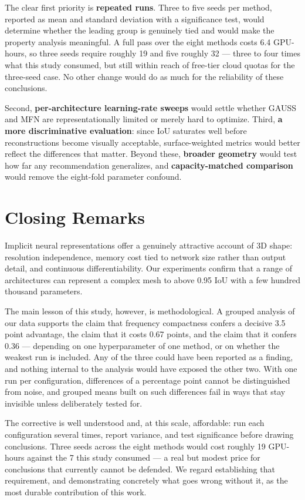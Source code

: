 The clear first priority is \textbf{repeated runs}. Three to five seeds per method, reported as mean and standard deviation with a significance test, would determine whether the leading group is genuinely tied and would make the property analysis meaningful. A full pass over the eight methods costs 6.4 GPU-hours, so three seeds require roughly 19 and five roughly 32 --- three to four times what this study consumed, but still within reach of free-tier cloud quotas for the three-seed case. No other change would do as much for the reliability of these conclusions.

Second, \textbf{per-architecture learning-rate sweeps} would settle whether GAUSS and MFN are representationally limited or merely hard to optimize. Third, \textbf{a more discriminative evaluation}: since IoU saturates well before reconstructions become visually acceptable, surface-weighted metrics would better reflect the differences that matter. Beyond these, \textbf{broader geometry} would test how far any recommendation generalizes, and \textbf{capacity-matched comparison} would remove the eight-fold parameter confound.

\section{Closing Remarks}

Implicit neural representations offer a genuinely attractive account of 3D shape: resolution independence, memory cost tied to network size rather than output detail, and continuous differentiability. Our experiments confirm that a range of architectures can represent a complex mesh to above 0.95 IoU with a few hundred thousand parameters.

The main lesson of this study, however, is methodological. A grouped analysis of our data supports the claim that frequency compactness confers a decisive 3.5 point advantage, the claim that it costs 0.67 points, and the claim that it confers 0.36 --- depending on one hyperparameter of one method, or on whether the weakest run is included. Any of the three could have been reported as a finding, and nothing internal to the analysis would have exposed the other two. With one run per configuration, differences of a percentage point cannot be distinguished from noise, and grouped means built on such differences fail in ways that stay invisible unless deliberately tested for.

The corrective is well understood and, at this scale, affordable: run each configuration several times, report variance, and test significance before drawing conclusions. Three seeds across the eight methods would cost roughly 19 GPU-hours against the 7 this study consumed --- a real but modest price for conclusions that currently cannot be defended. We regard establishing that requirement, and demonstrating concretely what goes wrong without it, as the most durable contribution of this work.

